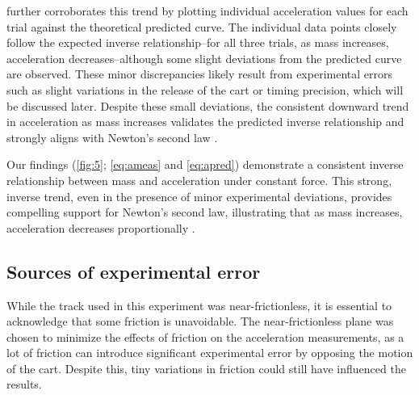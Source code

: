 ﻿\documentclass[reprint,amsmath,amssymb,prl]{revtex4-2}
\begin{document}
 further corroborates this trend by plotting individual acceleration values for each trial against the theoretical predicted curve. The individual data points closely follow the expected inverse relationship–for all three trials, as mass increases, acceleration decreases–although some slight deviations from the predicted curve are observed. These minor discrepancies likely result from experimental errors such as slight variations in the release of the cart or timing precision, which will be discussed later. Despite these small deviations, the consistent downward trend in acceleration as mass increases validates the predicted inverse relationship and strongly aligns with Newton’s second law \cite{knight2017physics}.


Our findings (\cref{fig:5}; \cref{eq:ameas} and \cref{eq:apred}) demonstrate a consistent inverse relationship between mass and acceleration under constant force. This strong, inverse trend, even in the presence of minor experimental deviations, provides compelling support for Newton’s second law, illustrating that as mass increases, acceleration decreases proportionally \cite{knight2017physics}. %

\subsection{Sources of experimental error}
While the track used in this experiment was near-frictionless, it is essential to acknowledge that some friction is unavoidable. The near-frictionless plane was chosen to minimize the effects of friction on the acceleration measurements, as a lot of friction can introduce significant experimental error by opposing the motion of the cart. Despite this, tiny variations in friction could still have influenced the results.
\end{document}
